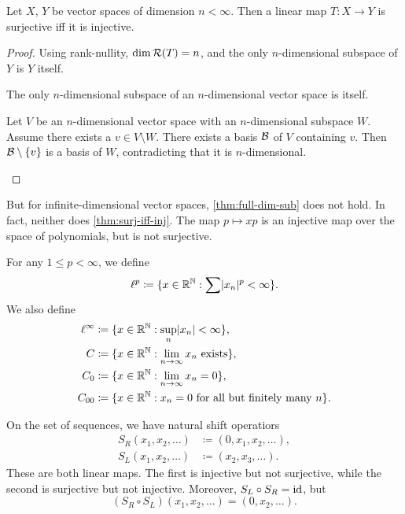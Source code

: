 \begin{proposition} \label{thm:surj-iff-inj}
    Let $X$, $Y$ be vector spaces of dimension $n < \infty$.
    Then a linear map $T\colon X \to Y$ is surjective iff it is injective.
\end{proposition}
\begin{proof}
    Using rank-nullity, $\operatorname{dim} \mathcal{R}(T) = n$, and the only $n$-dimensional
    subspace of $Y$ is $Y$ itself.
    \begin{claim} \label{thm:full-dim-sub}
        The only $n$-dimensional subspace of an $n$-dimensional vector space
        is itself.
    \end{claim}
    \begin{subproof}
        Let $V$ be an $n$-dimensional vector space with an $n$-dimensional
        subspace $W$.
        Assume there exists a $v \in V \setminus W$.
        There exists a basis $\mathcal{B}$ of $V$ containing $v$.
        Then $\mathcal{B} \setminus \{v\}$ is a basis of $W$, contradicting that
        it is $n$-dimensional.
    \end{subproof}
\end{proof}

But for infinite-dimensional vector spaces, \cref{thm:full-dim-sub} does not
hold.
In fact, neither does \cref{thm:surj-iff-inj}.
The map $p \mapsto x p$ is an injective map over the space of polynomials,
but is not surjective.

\begin{definition} \label{def:lp}
    For any $1 \le p < \infty$, we define \[
        \ell^p \coloneq \{x \in \mathbb{R}^{\mathbb{N}} : \sum \lvert x_n\rvert^p < \infty\}.
    \] We also define \begin{align*}
        \ell^\infty &\coloneq \{x \in \mathbb{R}^{\mathbb{N}} : \sup_n \lvert x_n\rvert < \infty\}, \\
        C &\coloneq \{x \in \mathbb{R}^{\mathbb{N}} : \lim_{n \to \infty} x_n \text{ exists}\}, \\
        C_0 &\coloneq \{x \in \mathbb{R}^{\mathbb{N}} : \lim_{n \to \infty} x_n = 0\}, \\
        C_{00} &\coloneq \{x \in \mathbb{R}^{\mathbb{N}} : x_n = 0 \text{ for all but finitely many } n\}.
    \end{align*}
\end{definition}
On the set of sequences, we have natural shift operatiors \begin{align*}
    S_R(x_1, x_2, \dots) &\coloneq (0, x_1, x_2, \dots), \\
    S_L(x_1, x_2, \dots) &\coloneq (x_2, x_3, \dots).
\end{align*}
These are both linear maps.
The first is injective but not surjective, while the second is surjective
but not injective.
Moreover, $S_L \circ S_R = \mathrm{id}$, but \[
    (S_R \circ S_L)(x_1, x_2, \dots) = (0, x_2, \dots).
\]

